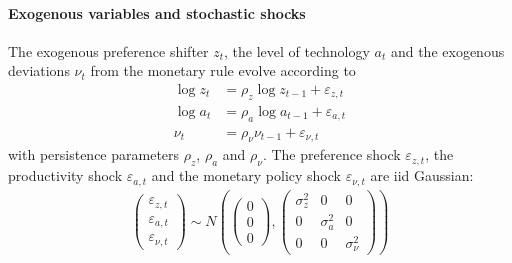 \paragraph{Exogenous variables and stochastic shocks}
The exogenous preference shifter \(z_t\), the level of technology \(a_t\) and the exogenous deviations  \(\nu_t\) from the monetary rule evolve according to
\begin{align}
    \log{z_t} &= \rho_z \log{z_{t-1}} + \varepsilon_{z,t} \label{eq:NewKeynesianLoMPreferenceShifter}\\
    \log{a_t} &= \rho_a \log{a_{t-1}} + \varepsilon_{a,t} \label{eq:NewKeynesianLoMTechnology}\\
    \nu_t &= \rho_\nu \nu_{t-1} + \varepsilon_{\nu,t} \label{eq:NewKeynesianLoMMonPol}
\end{align}
with persistence parameters \(\rho_z\), \(\rho_a\) and \(\rho_\nu \).
The preference shock \(\varepsilon_{z,t}\), the productivity shock \(\varepsilon_{a,t}\) and the monetary policy shock \(\varepsilon_{\nu,t}\) are iid Gaussian:
\begin{align*}
    \begin{pmatrix}
        \varepsilon_{z,t}\\\varepsilon_{a,t}\\\varepsilon_{\nu,t}
    \end{pmatrix}
    \sim N\left(\begin{pmatrix} 0\\0\\0\end{pmatrix}, \begin{pmatrix} \sigma_z^2 & 0& 0\\0 & \sigma_{a}^2& 0\\0 & 0 & \sigma_{\nu}^2\end{pmatrix}\right)
\end{align*}

